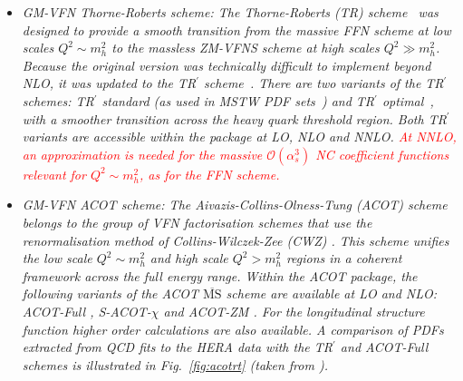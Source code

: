 \begin{itemize}
%
\item \it {GM-VFN Thorne-Roberts scheme:} \rm
%
%
The Thorne-Roberts (TR) scheme~\cite{Thorne:1997ga} was designed to provide a smooth transition 
from the massive FFN scheme at low scales $Q^2 \sim m_h^2$ to the massless ZM-VFNS scheme at high scales $Q^2 \gg m_h^2$. 
Because the original version was technically difficult to implement beyond NLO, it was updated 
to the TR$^\prime$ scheme~\cite{Thorne:2006qt}.
There are two variants of the TR$^\prime$ schemes: TR$^\prime$ standard (as used in MSTW PDF sets~\cite{Thorne:2006qt,MSTWpdf}) 
and TR$^\prime$ optimal~\cite{Thorne:6180}, with a smoother transition across the heavy quark threshold region. 
Both TR$^\prime$ variants are accessible within the \fitter package at LO, NLO and NNLO.
\textcolor{red}{
At NNLO, an approximation is needed for the massive $\mathcal{O}(\alpha_s^3)$ NC coefficient 
functions relevant for $Q^2\sim m_h^2$, as for the FFN scheme.
}
\vspace{0.1cm}
\item \it {GM-VFN ACOT scheme:} \rm
The Aivazis-Collins-Olness-Tung (ACOT) scheme belongs to the group of VFN factorisation 
schemes that use the renormalisation method of Collins-Wilczek-Zee (CWZ) \cite{CWZ}.
This scheme unifies the low scale $Q^2 \sim m_h^2$ and high scale $Q^2 > m_h^2$ regions
in a coherent framework across the full energy range.
%
Within the ACOT package, the following variants of the ACOT $\overline{\text{MS}}$ scheme are available at LO and NLO:
ACOT-Full \cite{Aivazis:1993pi}, S-ACOT-$\chi$ \cite{Kramer:2000hn,Kretzer:2003it} and ACOT-ZM \cite{Aivazis:1993pi}.
For the longitudinal structure function higher order calculations are also available. 
A comparison of PDFs extracted from QCD fits to the HERA data 
with the TR$^\prime$ and ACOT-Full schemes is illustrated in Fig.~\ref{fig:acotrt} (taken from \cite{h1zeus:2009wt}).


\end{itemize}
